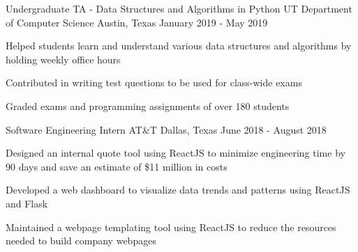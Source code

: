 \begin{cventries}

\cventry
{Undergraduate TA - Data Structures and Algorithms in Python} %
{UT Department of Computer Science} %
{Austin, Texas} %
{January 2019 - May 2019} %
{ %
\begin{cvitems}
\item {Helped students learn and understand various data structures and algorithms by holding weekly office hours}
\item {Contributed in writing test questions to be used for class-wide exams}
\item {Graded exams and programming assignments of over 180 students}
\end{cvitems}
}


\cventry
{Software Engineering Intern} %
{AT\&T} %
{Dallas, Texas} %
{June 2018 - August 2018} %
{ %
\begin{cvitems}
\item {Designed an internal quote tool using ReactJS to minimize engineering time by 90 days and save an estimate of \$11 million in costs}
\item {Developed a web dashboard to visualize data trends and patterns using ReactJS and Flask}
\item {Maintained a webpage templating tool using ReactJS to reduce the resources needed to build company webpages}
\end{cvitems}
}


\end{cventries}